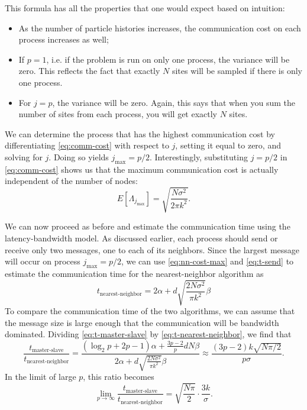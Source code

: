 This formula has all the properties that one would expect based on intuition:
\begin{itemize}
\item As the number of particle histories increases, the communication cost on
  each process increases as well;
\item If $p=1$, i.e. if the problem is run on only one process, the variance
  will be zero. This reflects the fact that exactly $N$ sites will be sampled if
  there is only one process.
\item For $j=p$, the variance will be zero. Again, this says that when you sum
  the number of sites from each process, you will get exactly $N$ sites.
\end{itemize}
We can determine the process that has the highest communication cost by
differentiating \eqref{eq:comm-cost} with respect to $j$, setting it equal to
zero, and solving for $j$. Doing so yields $j_{\text{max}} =
p/2$. Interestingly, substituting $j = p/2$ in \eqref{eq:comm-cost} shows us
that the maximum communication cost is actually independent of the number of
nodes:
\begin{equation}
  \label{eq:nn-cost-max}
  E \left [ \Lambda_{j_{\text{max}}} \right ] = \sqrt{ \frac{N\sigma^2}{2\pi
      k^2}}.
\end{equation}

We can now proceed as before and estimate the communication time using the
latency-bandwidth model. As discussed earlier, each process should send or
receive only two messages, one to each of its neighbors. Since the largest
message will occur on process $j_{\text{max}} = p/2$, we can use
\eqref{eq:nn-cost-max} and \eqref{eq:t-send} to estimate the communication time
for the nearest-neighbor algorithm as
\begin{equation}
  \label{eq:t-nearest-neighbor}
  t_{\text{nearest-neighbor}} = 2\alpha + d\sqrt{\frac{2N\sigma^2}{\pi k^2}} \beta
\end{equation}
To compare the communication time of the two algorithms, we can assume that the
message size is large enough that the communication will be bandwidth
dominated. Dividing \eqref{eq:t-master-slave} by \eqref{eq:t-nearest-neighbor},
we find that
\begin{equation}
  \frac{t_{\text{master-slave}}}{t_{\text{nearest-neighbor}}} = \frac{\left (
    \log_2 p + 2p - 1 \right ) \alpha + \frac{3p-2}{p} dN\beta}{2\alpha +
    d\sqrt{\frac{2N\sigma^2}{\pi k^2}} \beta} \approx \frac{ \left ( 3p - 2
    \right ) k \sqrt{N\pi/2}}{ p\sigma }.
\end{equation}
In the limit of large $p$, this ratio becomes
\begin{equation}
  \lim_{p\rightarrow\infty}
  \frac{t_{\text{master-slave}}}{t_{\text{nearest-neighbor}}} =
  \sqrt{\frac{N\pi}{2}} \cdot \frac{3k}{\sigma}.
\end{equation}

